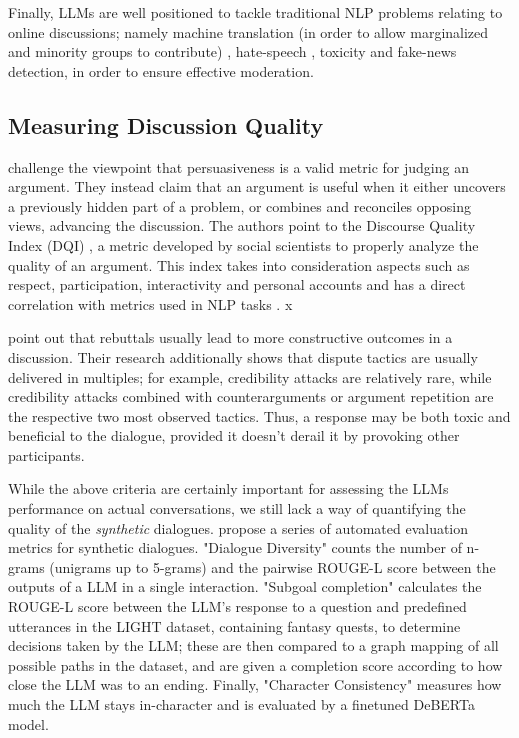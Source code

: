 Finally, LLMs are well positioned to tackle traditional \ac{NLP} problems relating to online discussions; namely machine translation (in order to allow marginalized and minority groups to contribute) \cite{Tsai2024Generative}, hate-speech \cite{Nirmal2024TowardsIH, shi-2024-hatespeech}, toxicity \cite{kang-qian-2024-implanting, Wang2022ToxicityDW} and fake-news \cite{Liu2024DetectIJ, Xu2024ACS, Xu2024ACS} detection, in order to ensure effective moderation. 


\subsection{Measuring Discussion Quality}
\label{sec:related:measures}

\citet{vecchi-2021-towards} challenge the viewpoint that persuasiveness is a valid metric for judging an argument. They instead claim that an argument is useful when it either uncovers a previously hidden part of a problem, or combines and reconciles opposing views, advancing the discussion. The authors point to the Discourse Quality Index (DQI) \cite{Steiner2005-STEDPI-8, stab-gurevych-2017-parsing}, a metric developed by social scientists to properly analyze the quality of an argument. This index takes into consideration aspects such as respect, participation, interactivity and personal accounts and has a direct correlation with metrics used in NLP tasks \cite{wachsmuth-etal-2017-computational}. x

\citet{dekock2022disagree} point out that rebuttals usually lead to more constructive outcomes in a discussion. Their research additionally shows that dispute tactics are usually delivered in multiples; for example, credibility attacks are relatively rare, while credibility attacks combined with counterarguments or argument repetition are the respective two most observed tactics. Thus, a response may be both toxic and beneficial to the dialogue, provided it doesn't derail it by provoking other participants.

While the above criteria are certainly important for assessing the LLMs performance on actual conversations, we still lack a way of quantifying the quality of the \textit{synthetic} dialogues. \citet{ulmer2024bootstrappingllmbasedtaskorienteddialogue} propose a series of automated evaluation metrics for synthetic dialogues. "Dialogue Diversity" counts the number of n-grams (unigrams up to 5-grams) and the pairwise ROUGE-L \cite{lin-2004-rouge} score between the outputs of a LLM in a single interaction. "Subgoal completion" calculates the ROUGE-L score between the LLM's response to a question and predefined utterances in the LIGHT \cite{urbanek-etal-2019-learning} dataset, containing fantasy quests, to determine decisions taken by the LLM; these are then compared to a graph mapping of all possible paths in the dataset, and are given a completion score according to how close the LLM was to an ending. Finally, "Character Consistency" measures how much the LLM stays in-character and is evaluated by a finetuned DeBERTa \cite{he2023debertav3improvingdebertausing} model.



